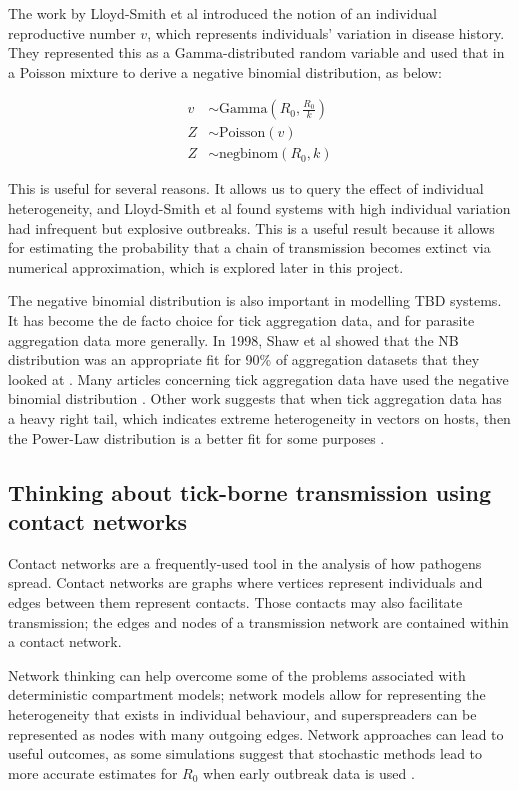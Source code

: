 \documentclass{article}
\begin{document}
The work by Lloyd-Smith et al introduced the notion of an individual reproductive number $ v $, which represents individuals' variation in disease history. They represented this as a Gamma-distributed random variable and used that in a Poisson mixture to derive a negative binomial distribution, as below:

\begin{align}\label{PoissonMixture}
	v &\sim \text{Gamma}\left(R_0, \frac{R_0}{k}\right) \nonumber \\
	Z &\sim \text{Poisson}(v) \\
	Z &\sim \text{negbinom}(R_0, k) \nonumber
\end{align}

This is useful for several reasons. It allows us to query the effect of individual heterogeneity, and Lloyd-Smith et al found systems with high individual variation had infrequent but explosive outbreaks. This is a useful result because it allows for estimating the probability that a chain of transmission becomes extinct via numerical approximation, which is explored later in this project.

The negative binomial distribution is also important in modelling TBD systems. It has become the de facto choice for tick aggregation data, and for parasite aggregation data more generally. In 1998, Shaw et al showed that the NB distribution was an appropriate fit for 90\% of aggregation datasets that they looked at \cite{SHAW1998}. Many articles concerning tick aggregation data have used the negative binomial distribution \cite{Bown2003, HARRISON2012, Brunner2008}. Other work suggests that when tick aggregation data has a heavy right tail, which indicates extreme heterogeneity in vectors on hosts, then the Power-Law distribution is a better fit for some purposes \cite{Ferreri2014, Bisanzio2010}.

\subsection{Thinking about tick-borne transmission using contact networks}

Contact networks are a frequently-used tool in the analysis of how pathogens spread. Contact networks are graphs where vertices represent individuals and edges between them represent contacts. Those contacts may also facilitate transmission; the edges and nodes of a transmission network are contained within a contact network. 

Network thinking can help overcome some of the problems associated with deterministic compartment models; network models allow for representing the heterogeneity that exists in individual behaviour, and superspreaders can be represented as nodes with many outgoing edges. Network approaches can lead to useful outcomes, as some simulations suggest that stochastic methods lead to more accurate estimates for $ R_0 $ when early outbreak data is used \cite{Brauer2008b}.
\end{document}
